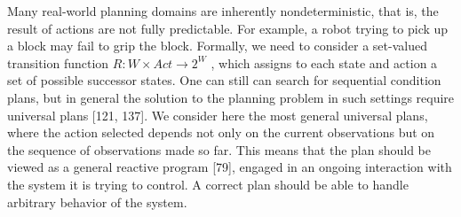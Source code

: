 




Many real-world planning domains are inherently nondeterministic, that is, the result of actions are not fully predictable. For example, a robot trying to pick up a block may fail to grip the block. Formally, we need to consider a set-valued transition function $R : W \times Act \rightarrow 2^W$ , which assigns to each state and action a set of possible successor states. One can still can search for sequential condition plans, but in general the solution to the planning problem in such settings require universal plans [121, 137]. We consider here the most general universal plans, where the action selected depends not only on the current observations but on the sequence of observations made so far. This means that the plan should be viewed as a general reactive program [79], engaged in an ongoing interaction with the system it is trying to control. A correct plan should be able to handle arbitrary behavior of the system.





